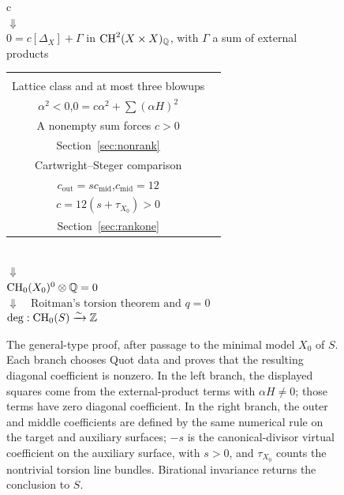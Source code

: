\begin{figure}[ht]
\centering
\small
\begin{tabular}{c}
\\[3pt]
$\Downarrow$\\[3pt]
$0=c[\Delta_X]+\Gamma$ in $\operatorname{CH}^2(X\times X)_{\mathbb Q}$,
with $\Gamma$ a sum of external products\\[8pt]
\begin{tabular}{c@{\hspace{1.4em}}c}
\fbox{\begin{minipage}{0.39\linewidth}\centering
$K_{X_0}^2\leq 8$\\
Lattice class and at most three blowups\\
$\alpha^2<0$,\quad $0=c\alpha^2+\sum(\alpha H)^2$\\
A nonempty sum forces $c>0$\\
Section~\ref{sec:nonrank}
\end{minipage}}
&
\fbox{\begin{minipage}{0.39\linewidth}\centering
$K_{X_0}^2=9$\\
Cartwright--Steger comparison\\
$c_{\mathrm{out}}=s c_{\mathrm{mid}}$,\quad $c_{\mathrm{mid}}=12$\\
$c=12(s+\tau_{X_0})>0$\\
Section~\ref{sec:rankone}
\end{minipage}}
\end{tabular}\\[3pt]
$\Downarrow$\\[3pt]
$\operatorname{CH}_0(X_0)^0\otimes\mathbb Q=0$\\[3pt]
$\Downarrow\quad\text{Roitman's torsion theorem and }q=0$\\[3pt]
$\deg:\operatorname{CH}_0(S)\xrightarrow{\sim}\mathbb Z$
\end{tabular}
\caption{The general-type proof, after passage to the minimal model
$X_0$ of $S$.  Each branch chooses Quot data and proves that the
resulting diagonal coefficient is nonzero. In the left branch,
the displayed squares come from the external-product terms with
$\alpha H\ne0$; those terms have zero diagonal coefficient.
In the right branch, the outer and middle coefficients are defined
by the same numerical rule on the target and auxiliary surfaces;
$-s$ is the canonical-divisor virtual coefficient on the auxiliary
surface, with $s>0$, and $\tau_{X_0}$ counts the nontrivial torsion
line bundles.  Birational invariance returns the conclusion to $S$.}
\label{fig:proof-flow}
\end{figure}
